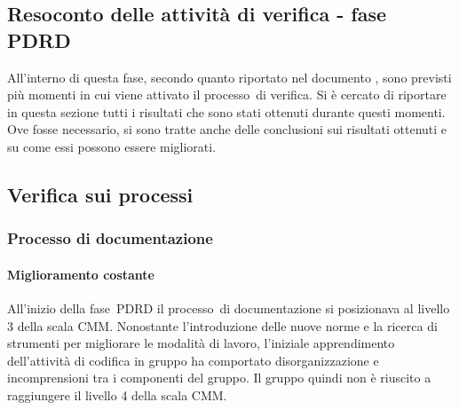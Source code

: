 \documentclass[../PianoDiQualifica.tex]{subfiles}
\begin{document}
\begin{appendices}
\section{Resoconto delle attività di verifica - fase PDRD}
All'interno di questa fase\g, secondo quanto riportato nel documento \pianodiprogetto, sono previsti più momenti in cui viene attivato il processo\g\ di verifica. Si è cercato di riportare in questa sezione tutti i risultati che sono stati ottenuti durante questi momenti. Ove fosse necessario, si sono tratte anche delle conclusioni sui risultati ottenuti e su come essi possono essere migliorati.
	
	\subsection{Verifica sui processi}
		\subsubsection{Processo di documentazione}
			\paragraph{Miglioramento costante}
			All'inizio della fase\g\ PDRD il processo\g\ di documentazione si posizionava al livello 3 della scala CMM\g.
			Nonostante l'introduzione delle nuove norme e la ricerca di strumenti per migliorare le modalità di lavoro, l'iniziale apprendimento dell'attività di codifica in gruppo ha comportato disorganizzazione e incomprensioni tra i componenti del gruppo. Il gruppo quindi non è riuscito a raggiungere il livello 4 della scala CMM\g.
			

\end{appendices}
\end{document}
